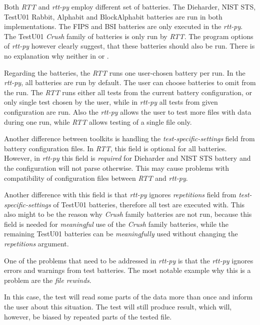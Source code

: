 \documentclass[
  digital,     %
  oneside,     %
  nosansbold,  %
  nocolorbold, %
  nolof,         %
  nolot,         %
]{fithesis4}
\begin{document}
Both \emph{RTT} and \emph{rtt-py} employ different set of batteries. The Dieharder, NIST STS, TestU01 Rabbit, Alphabit and BlockAlphabit batteries are run in both implementations. The FIPS and BSI batteries are only executed in the \emph{rtt-py}. The TestU01 \emph{Crush} family of batteries is only run by \emph{RTT}. The program options of \emph{rtt-py} however clearly suggest, that these batteries should also be run. There is no explanation why neither in \cite{vavercak} or \cite{rtt-py-site}.

Regarding the batteries, the \emph{RTT} runs one user-chosen battery per run. In the \emph{rtt-py}, all batteries are run by default. The user can choose batteries to omit from the run. The \emph{RTT} runs either all tests from the current battery configuration, or only single test chosen by the user, while in \emph{rtt-py} all tests from given configuration are run. Also the \emph{rtt-py} allows the user to test more files with data during one run, while \emph{RTT} allows testing of a single file only.

Another difference between toolkits is handling the \emph{test-specific-settings} field from battery configuration files. In \emph{RTT}, this field is optional for all batteries. However, in \emph{rtt-py} this field is \emph{required} for Dieharder and NIST STS battery and the configuration will not parse otherwise. This may cause problems with compatibility of configuration files between \emph{RTT} and \emph{rtt-py}.

Another difference with this field is that \emph{rtt-py} ignores \emph{repetitions} field from \emph{test-specific-settings} of TestU01 batteries, therefore all test are executed with. This also might to be the reason why \emph{Crush} family batteries are not run, because this field is needed for \emph{meaningful} use of the \emph{Crush} family batteries, while the remaining TestU01 batteries can be \emph{meaningfully} used without changing the \emph{repetitions} argument.

One of the problems that need to be addressed in \emph{rtt-py} is that the \emph{rtt-py} ignores errors and warnings from test batteries. The most notable example why this is a problem are the \emph{file rewinds}.

In this case, the test will read some parts of the data more than once and inform the user about this situation. The test will still produce result, which will, however, be biased by repeated parts of the tested file.
\end{document}
